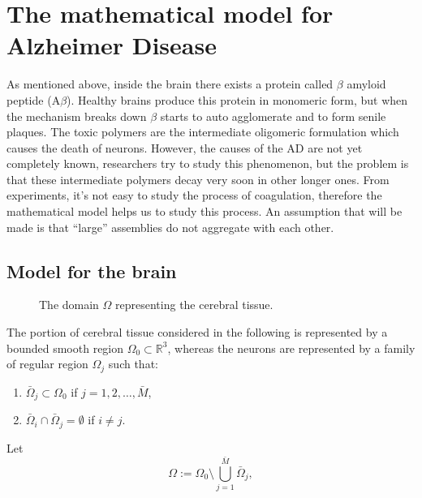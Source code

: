 \section{The mathematical model for Alzheimer Disease}
As mentioned above, inside the brain there exists a protein called \(\beta\) amyloid peptide ($\mathrm{A} \beta$). Healthy brains produce this protein in monomeric form, but when the mechanism breaks down \(\beta\) starts to auto agglomerate and to form senile plaques. The toxic polymers are the intermediate oligomeric formulation which causes the death of neurons. However, the causes of the AD are not yet completely known, researchers try to study this phenomenon, but the problem is that these intermediate polymers decay very soon in other longer ones. From experiments, it's not easy to study the process of coagulation, therefore the mathematical model helps us to study this process. An assumption that will be made is that ``large'' assemblies do not aggregate with each other.
\subsection{Model for the brain}
\begin{figure}[H]
  \centering
  \caption{The domain $\Omega$ representing the cerebral tissue.}
  \label{fig:domain}
\end{figure}
The portion of cerebral tissue considered  in the following is represented by a bounded smooth region $\Omega_{0}\subset \mathbb{R}^3$, whereas the neurons are represented by a family of regular region $\Omega_{j}$ such that:
\begin{enumerate}[label=(\roman*)]
    \item $\bar\Omega_{j}\subset \Omega_{0}$  if   $j=1,2,\dots,\bar{M}$,
    \item $\bar\Omega_{i}\cap \bar\Omega_{j}= \emptyset$  if $i\neq j$.
\end{enumerate}
Let 
$$
\Omega := \Omega_{0} \setminus
\bigcup_{j=1}^{\bar M} \bar\Omega_{j},
$$


